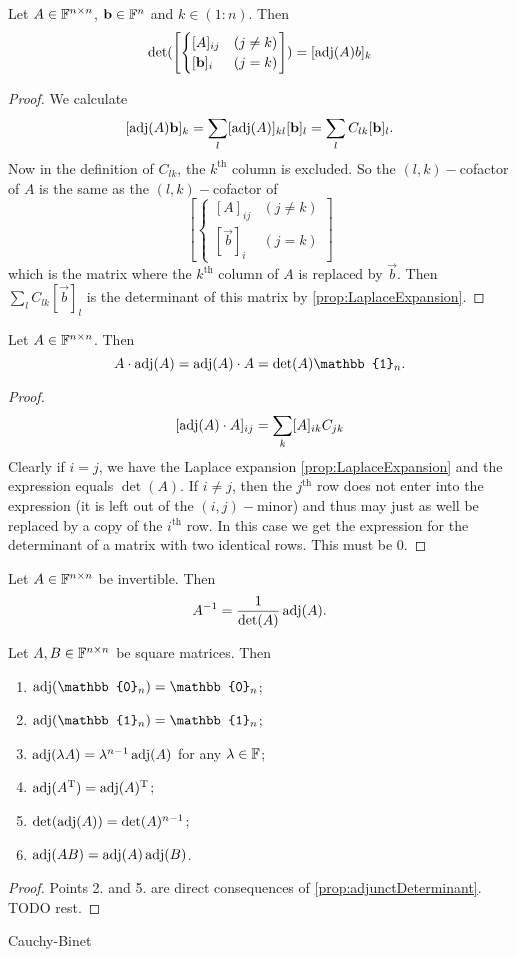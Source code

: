 \begin{lemma}
Let $A\in\mathbb{F}^{n\times n}$, $\bm{\mathrm{b}}\in \mathbb{F}^n$ and $k\in(1:n)$. Then
\[ \det(\left[\begin{cases}
[A]_{ij} & (j\neq k) \\
[\vec{b}]_i & (j=k)
\end{cases}\right]) = [\adj(A)b]_k \]
\end{lemma}
\begin{proof}
We calculate
\[ [\operatorname{adj}(A)\bm{\mathrm{b}}]_k = \sum_l [\operatorname{adj}(A)]_{kl}[\bm{\mathrm{b}}]_l = \sum_l C_{lk}[\bm{\mathrm{b}}]_l. \]
Now in the definition of $C_{lk}$, the $k^\text{th}$ column is excluded. So the $(l,k)-$cofactor of $A$ is the same as the $(l,k)-$cofactor of 
\[ \left[\begin{cases}
[A]_{ij} & (j\neq k) \\
[\vec{b}]_i & (j=k)
\end{cases}\right] \]
which is the matrix where the $k^\text{th}$ column of $A$ is replaced by $\vec{b}$. Then $\sum_l C_{lk}[\vec{b}]_l$ is the determinant of this matrix by \ref{prop:LaplaceExpansion}.
\end{proof}

\begin{proposition} \label{prop:adjunctDeterminant}
Let $A\in\mathbb{F}^{n\times n}$. Then
\[ A\cdot\adj(A) = \adj(A)\cdot A = \det(A) \mathbb{1}_n. \]
\end{proposition}
\begin{proof}
\[ [\operatorname{adj}(A)\cdot A]_{ij} = \sum_k [A]_{ik}C_{jk} \]
Clearly if $i=j$, we have the Laplace expansion \ref{prop:LaplaceExpansion} and the expression equals $\det(A)$. If $i\neq j$, then the $j^\text{th}$ row does not enter into the expression (it is left out of the $(i,j)-$minor) and thus may just as well be replaced by a copy of the $i^\text{th}$ row. In this case we get the expression for the determinant of a matrix with two identical rows. This must be $0$.
\end{proof}
\begin{corollary}
Let $A\in\mathbb{F}^{n\times n}$ be invertible. Then
\[ A^{-1} = \frac{1}{\det(A)}\operatorname{adj}(A). \]
\end{corollary}

\begin{proposition}
Let $A,B\in\mathbb{F}^{n\times n}$ be square matrices. Then
\begin{enumerate}
\item $\adj(\mathbb{0}_n) = \mathbb{0}_n$;
\item $\adj(\mathbb{1}_n) = \mathbb{1}_n$;
\item $\operatorname{adj}(\lambda A) = \lambda^{n-1}\operatorname{adj}(A)$ for any $\lambda\in \mathbb{F}$;
\item $\operatorname{adj}(A^{\mathrm{T}}) = \operatorname{adj}(A)^{\mathrm{T}}$;
\item $\det(\operatorname{adj}(A)) = \det(A)^{n-1}$;
\item $\operatorname{adj}(AB) = \operatorname{adj}(A)\operatorname{adj}(B)$.
\end{enumerate}
\end{proposition}
\begin{proof}
Points 2. and 5. are direct consequences of \ref{prop:adjunctDeterminant}. TODO rest.
\end{proof}
Cauchy-Binet

